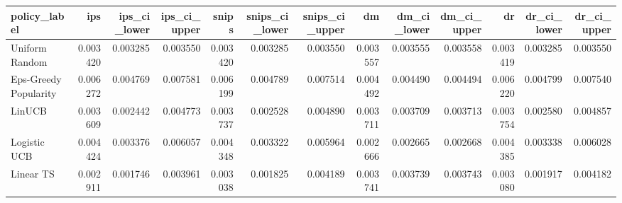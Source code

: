 \begin{tabular}{lrrrrrrrrrrrr}
\toprule
         policy\_label &      ips &  ips\_ci\_lower &  ips\_ci\_upper &    snips &  snips\_ci\_lower &  snips\_ci\_upper &       dm &  dm\_ci\_lower &  dm\_ci\_upper &       dr &  dr\_ci\_lower &  dr\_ci\_upper \\
\midrule
       Uniform Random & 0.003420 &      0.003285 &      0.003550 & 0.003420 &        0.003285 &        0.003550 & 0.003557 &     0.003555 &     0.003558 & 0.003419 &     0.003285 &     0.003550 \\
Eps-Greedy Popularity & 0.006272 &      0.004769 &      0.007581 & 0.006199 &        0.004789 &        0.007514 & 0.004492 &     0.004490 &     0.004494 & 0.006220 &     0.004799 &     0.007540 \\
               LinUCB & 0.003609 &      0.002442 &      0.004773 & 0.003737 &        0.002528 &        0.004890 & 0.003711 &     0.003709 &     0.003713 & 0.003754 &     0.002580 &     0.004857 \\
         Logistic UCB & 0.004424 &      0.003376 &      0.006057 & 0.004348 &        0.003322 &        0.005964 & 0.002666 &     0.002665 &     0.002668 & 0.004385 &     0.003338 &     0.006028 \\
            Linear TS & 0.002911 &      0.001746 &      0.003961 & 0.003038 &        0.001825 &        0.004189 & 0.003741 &     0.003739 &     0.003743 & 0.003080 &     0.001917 &     0.004182 \\
\bottomrule
\end{tabular}
